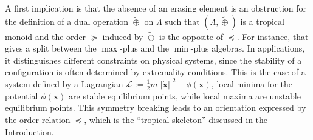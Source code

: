 \documentclass[11pt,british,reqno]{article}
\numberwithin{equation}{section}
\numberwithin{figure}{section}
\numberwithin{table}{section}
\theoremstyle{definition}
\theoremstyle{definition}
\theoremstyle{plain}
\theoremstyle{plain}
\theoremstyle{remark}
\theoremstyle{plain}
\numberwithin{equation}{section}
\numberwithin{figure}{section}
\numberwithin{table}{section}
\theoremstyle{plain}
\begin{document}
A first implication is that the absence of an erasing element is an
obstruction for the definition of a dual operation $\tilde{\oplus}$
on $\Lambda$ such that $(\Lambda,\tilde{\oplus})$ is a tropical
monoid and the order $\succeq$ induced by $\tilde{\oplus}$ is the
opposite of $\preceq$. For instance, that gives a split between the
$\max$-plus and the $\min$-plus algebras. In applications, it distinguishes
different constraints on physical systems, since the stability of a configuration
is often determined by extremality conditions. This is the case of
a system defined by a Lagrangian $\mathcal{L}:=\frac{1}{2}m||\dot{\boldsymbol{x}}||^{2}-\phi(\boldsymbol{x})$,
local minima for the potential $\phi(\boldsymbol{x})$ are stable
equilibrium points, while local maxima are unstable equilibrium points.
This symmetry breaking leads to an orientation expressed by the order
relation $\preceq$, which is the ``tropical skeleton'' discussed
in the Introduction. 
\end{document}
